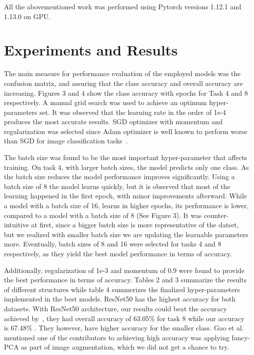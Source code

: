 \documentclass[10pt,twocolumn,letterpaper]{article}
\begin{document}
All the abovementioned work was performed using Pytorch versions 1.12.1 and 1.13.0 on GPU.  


\section{Experiments and Results}
The main measure for performance evaluation of the employed models was the confusion matrix, and assuring that the class accuracy and overall accuracy are increasing. Figures 3 and 4 show the class accuracy with epochs for Task 4 and 8 respectively. 
A manual grid search was used to achieve an optimum hyper-parameters set. It was observed that the learning rate in the order of 1e-4 produces the most accurate results. SGD optimizer with momentum and regularization was selected since Adam optimizer is well known to perform worse than SGD for image classification tasks~\cite{Gupta01}. 

The batch size was found to be the most important hyper-parameter that affects training. On task 4, with larger batch sizes, the model predicts only one class. As the batch size reduces the model performance improves significantly. Using a batch size of 8 the model learns quickly, but it is observed that most of the learning happened in the first epoch, with minor improvements afterward. While a model with a batch size of 16, learns in higher epochs, its performance is lower, compared to a model with a batch size of 8 (See Figure 3). It was counter-intuitive at first, since a bigger batch size is more representative of the datset, but we realized with smaller batch size we are updating the learnable parameters more. Eventually, batch sizes of 8 and 16 were selected for tasks 4 and 8 respectively, as they yield the best model performance in terms of accuracy.

Additionally, regularization of 1e-3 and momentum of 0.9 were found to provide the best performance in terms of accuracy. Tables 2 and 3 summarize the results of different structures while table 4 summerizes the finalized hyper-parameters implemented in the best models. ResNet50 has the highest accuracy for both datasets. With ResNet50 architecture, our results could beat the accuracy achieved by~\cite{Gao01}, they had overall accuracy of 63.05$\%$ for task 8 while our accuracy is 67.48$\%$ . They however, have higher accuracy for the smaller class. Gao et al.~\cite{Gao01} mentioned one of the contributors to achieving high accuracy was applying fancy-PCA as part of image augmentation, which we did not get a chance to try. 
\end{document}
